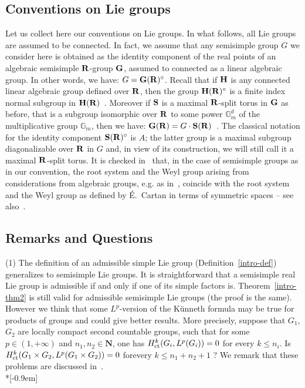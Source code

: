 \documentclass[11pt]{article}
\theoremstyle{definition}
\numberwithin{equation}{section}
\numberwithin{figure}{section}
\numberwithin{table}{section}
\DeclareMathOperator{\ct}{ct}
\begin{document}
\subsection*{Conventions on Lie groups}

Let us collect here our conventions on Lie groups. In what follows, all Lie groups are assumed to be connected. In fact, we assume that any semisimple group $G$ we consider here is obtained as the identity component of the real points of an algebraic semisimple ${\bf R}$-group ${\bf G}$, assumed to connected as a linear algebraic group. In other words, we have: $G = {\bf G}({\bf R})^\circ$. Recall that if ${\bf H}$ is any connected linear algebraic group defined over ${\bf R}$, then the group ${\bf H}({\bf R})^\circ$ is a finite index normal subgroup in ${\bf H}({\bf R})$~\cite[14.1]{BoTi}. Moreover if ${\bf S}$ is a maximal ${\bf R}$-split torus in ${\bf G}$ as before, that is a subgroup isomorphic over ${\bf R}$ to some power ${\mathbb G}_m^d$ of the multiplicative group ${\mathbb G}_m$, then we have: ${\bf G}({\bf R}) = G \cdot {\bf S}({\bf R})$~\cite[Theorem~14.4]{BoTi}. The classical notation for the identity component ${\bf S}({\bf R})^\circ$ is $A$; the latter group is a maximal subgroup diagonalizable over ${\bf R}$ in $G$ and, in view of its construction, we will still call it a maximal ${\bf R}$-split torus. It is checked in~\cite[14.7]{BoTi} that, in the case of semisimple groups as in our convention, the root system and the Weyl group arising from considerations from algebraic groups, e.g. as in~\cite[\textsection~21]{Borel-LAG}, coincide with the root system and the Weyl group as defined by É.~Cartan in terms of symmetric spaces -- see also~\cite[\textsection~24.C]{Borel-LAG}.


\subsection*{Remarks and Questions}

(1) The definition of an admissible simple Lie group (Definition~\ref{intro-def}) generalizes to semisimple Lie groups. It is straightforward that a semisimple real Lie group is admissible if and only if one of its simple factors is. Theorem~\ref{intro-thm2} is still valid for admissible semisimple Lie groups (the proof is the same). However we think that some $L^p$-version of the K\"unneth formula may be true for products of groups and could give better results. More precisely, suppose that $G_1$, $G_2$ are locally compact second countable groups, such that for some $p \in (1, +\infty)$ and $n_1, n_2 \in \mathbf N$, one has ${\rm H}^k_{\ct} (G_i, L^p(G_i)) =0$ for every $k\le n_i$. Is ${\rm H}^k _{\ct} (G_1 \times G_2, L^p(G_1 \times G_2)) =0$ for\linebreak every $k \le n_1 + n_2 +1$ ? We remark that these problems are discussed in~\cite[p.~252]{G}.\ \\*[-0.9em]
\end{document}
